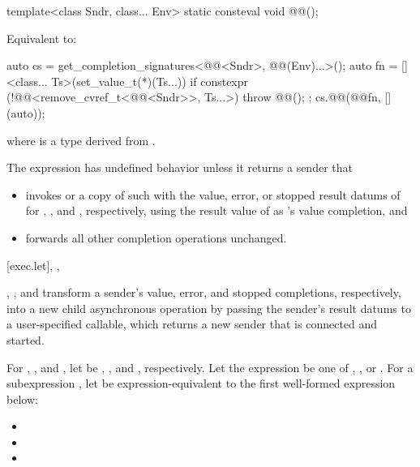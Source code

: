 \begin{itemdecl}
template<class Sndr, class... Env>
  static consteval void @@();
\end{itemdecl}

\begin{itemdescr}
\pnum
\effects
Equivalent to:
\begin{codeblock}
auto cs = get_completion_signatures<@@<Sndr>, @@(Env)...>();
auto fn = []<class... Ts>(set_value_t(*)(Ts...)) {
  if constexpr (!@@<remove_cvref_t<@@<Sndr>>, Ts...>)
    throw @@();
};
cs.@@(@@{fn, [](auto){}});
\end{codeblock}
where  is
a type derived from .
\end{itemdescr}

\pnum
The expression  has undefined behavior
unless it returns a sender  that
\begin{itemize}
\item
invokes  or a copy of such
with the value, error, or stopped result datums of 
for , , and , respectively,
using the result value of  as 's value completion, and
\item
forwards all other completion operations unchanged.
\end{itemize}

[exec.let]{, , }

\pnum
{}, , and  transform
a sender's value, error, and stopped completions, respectively,
into a new child asynchronous operation
by passing the sender's result datums to a user-specified callable,
which returns a new sender that is connected and started.

\pnum
For , , and ,
let  be
, , and , respectively.
Let the expression  be one of
, , or .
For a subexpression ,
let  be expression-equivalent to
the first well-formed expression below:
\begin{itemize}
\item
{}
\item
{}
\item
{}
\end{itemize}

